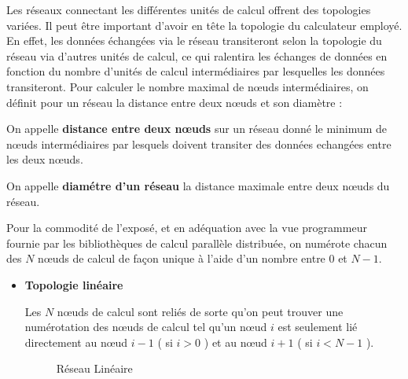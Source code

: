 \documentclass[fleqn,11pt]{article}
\begin{document}
\begin{itemize}
Les réseaux connectant les différentes unités de calcul offrent des topologies variées. Il peut être important d'avoir en tête la topologie du calculateur employé. En effet, les données échangées via le réseau transiteront selon la topologie du réseau via d'autres unités de calcul, ce qui ralentira les échanges de données en fonction du nombre d'unités de calcul intermédiaires par lesquelles les données transiteront. Pour calculer le nombre maximal de nœuds intermédiaires,  on définit pour un réseau la distance entre deux nœuds et son diamètre :

On appelle \textbf{distance entre deux nœuds} sur un réseau donné le minimum de nœuds
intermédiaires par lesquels doivent transiter des données echangées entre les deux
nœuds.

On appelle \textbf{diamétre d'un réseau} la distance maximale entre
deux nœuds du réseau. 

Pour la commodité de l'exposé, et en adéquation avec la vue programmeur
fournie par les bibliothèques de calcul parallèle distribuée, on numérote
chacun des $N$ nœuds de calcul de façon unique à l'aide d'un nombre entre
0 et $N-1$.

\begin{itemize}
\item \textbf{Topologie linéaire}

Les $N$ nœuds de calcul sont reliés de sorte qu'on peut trouver une numérotation
des nœuds de calcul tel qu'un nœud $i$ est seulement lié directement au
nœud $i-1$ ( si $ i > 0$ ) et au nœud $i+1$ ( si $i < N-1$ ).

\begin{figure}
\begin{center}
\end{center}
\label{fig:reslin}
\caption{Réseau Linéaire}
\end{figure}


\end{itemize}
\end{itemize}
\end{document}
